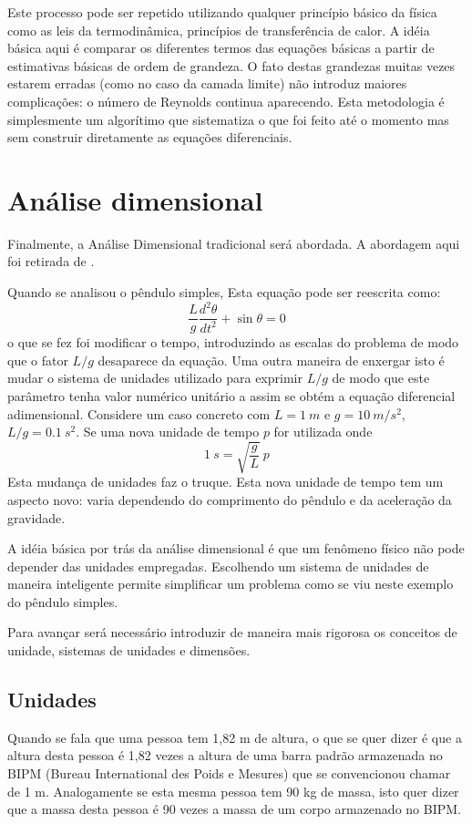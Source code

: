 \documentclass[article,12pt,oneside,a4paper,english,brazil,sumario=tradicional]{abntex2}
\begin{document}
Este processo pode ser repetido utilizando qualquer princípio básico da física como as leis da termodinâmica, princípios de transferência de calor. A idéia básica aqui é comparar os diferentes termos das equações básicas a partir de estimativas básicas de ordem de grandeza. O fato destas grandezas muitas vezes estarem erradas (como no caso da camada limite) não introduz maiores complicações: o número de Reynolds continua aparecendo. Esta metodologia é simplesmente um algorítimo que sistematiza o que foi feito até o momento mas sem construir diretamente as equações diferenciais.



\section{Análise dimensional}
\label{sec:adim}

Finalmente, a Análise Dimensional tradicional será abordada. A abordagem aqui foi retirada de . 

Quando se analisou o pêndulo simples, 
Esta equação pode ser reescrita como:
\[
\frac{L}{g}\frac{d^2\theta}{dt^2} + \sin\theta = 0 
\]
o que se fez foi modificar o tempo, introduzindo as escalas do problema de modo que o fator $L/g$ desaparece da equação. Uma outra maneira de enxergar isto é mudar o sistema de unidades utilizado para exprimir $L/g$ de modo que este parâmetro tenha valor numérico unitário a assim se obtém a equação diferencial adimensional. Considere um caso concreto com $L = 1\:m$ e $g = 10\: m/s^2$, $L/g=0.1\:s^2$. Se uma nova unidade de tempo $p$ for utilizada onde 
\[
1\:s = \sqrt{\frac{g}{L}}\:p
\] 
Esta mudança de unidades faz o truque. Esta nova unidade de tempo tem um aspecto novo: varia dependendo do comprimento do pêndulo e da aceleração da gravidade.

A idéia básica por trás da análise dimensional é que um fenômeno físico não pode depender das unidades empregadas. Escolhendo um sistema de unidades de maneira inteligente permite simplificar um problema como se viu neste exemplo do pêndulo simples.

Para avançar será necessário introduzir de maneira mais rigorosa os conceitos de unidade, sistemas de unidades e dimensões.

\subsection{Unidades}

Quando se fala que uma pessoa tem 1,82 m de altura, o que se quer dizer é que a altura desta pessoa é 1,82 vezes a altura de uma barra padrão armazenada no BIPM (Bureau International des Poids e Mesures) que se convencionou chamar de 1 m. Analogamente se esta mesma pessoa tem 90 kg de massa, isto quer dizer que a massa desta pessoa é 90 vezes a massa de um corpo armazenado no BIPM.
\end{document}
